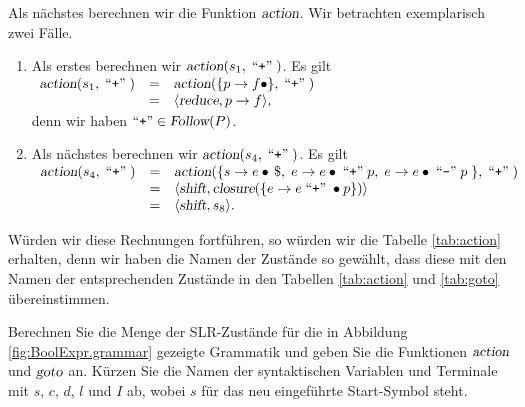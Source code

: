 Als n\"achstes berechnen wir die Funktion $\textsl{action}$.  Wir betrachten exemplarisch
zwei F\"alle.
\begin{enumerate}
\item Als erstes berechnen wir $\textsl{action}(s_1, \;\mbox{``\texttt{+}''}\;)$.  Es gilt
      \\[0.2cm]
      \hspace*{1.3cm}
      $ 
      \begin{array}[t]{lcl}
      \textsl{action}(s_1, \;\mbox{``\texttt{+}''}\;) & = & 
            \textsl{action}(\{p \rightarrow f \bullet\}, \;\mbox{``\texttt{+}''}\;) \\
      & = & \langle \textsl{reduce}, p \rightarrow f \rangle,
      \end{array}
      $
\\[0.2cm]
      denn wir haben $\mbox{``\texttt{+}''} \in \textsl{Follow}(P)$.
\item Als n\"achstes berechnen wir  $\textsl{action}(s_4, \;\mbox{``\texttt{+}''}\;)$.  Es gilt
      \\[0.2cm]
\hspace*{1.3cm}
$ 
      \begin{array}[t]{lcl}
      \textsl{action}(s_4, \quoted{+}) & = & 
            \textsl{action}(\{ s \rightarrow e \bullet\,\symbol{36},\;
                 e \rightarrow e \bullet \quoted{+} p,\; 
                 e \rightarrow e \bullet \quoted{-} p \; \}, \quoted{+}) \\
      & = & \langle \textsl{shift}, \textsl{closure}(\{ e \rightarrow e \quoted{+} \bullet p\}) \rangle \\
      & = & \langle \textsl{shift}, s_8 \rangle.
      \end{array}
      $
\\[0.2cm]
\end{enumerate}
W\"urden wir diese Rechnungen fortf\"uhren, so w\"urden wir die Tabelle \ref{tab:action} erhalten, denn 
wir haben die Namen der Zust\"ande so gew\"ahlt, dass diese mit den Namen der entsprechenden Zust\"ande
in den Tabellen \ref{tab:action} und \ref{tab:goto} \"ubereinstimmen.

\exercise
Berechnen Sie die Menge der SLR-Zust\"ande f\"ur die in Abbildung \ref{fig:BoolExpr.grammar} gezeigte
Grammatik und geben Sie die Funktionen $\textsl{action}$ und $\textsl{goto}$ an.
K\"urzen Sie die Namen der syntaktischen Variablen und Terminale mit $s$, $c$, $d$, $l$ und $I$
ab, wobei $s$ f\"ur das neu eingef\"uhrte Start-Symbol steht.  \eox
\vspace*{0.2cm}


